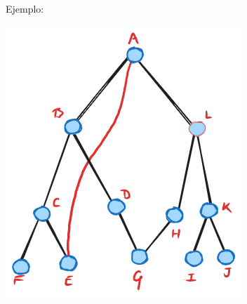 \documentclass[notheorems]{beamer}
\begin{document}
\begin{frame}{Ejemplo:}
\begin{center}
\includegraphics[scale = 0.5]{grafo_1.png}
\end{center}
\end{frame}
\end{document}
